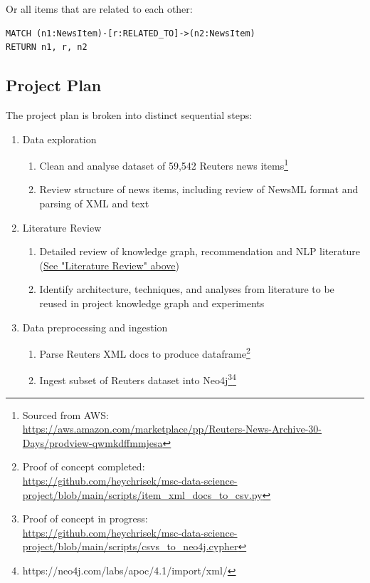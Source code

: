 \documentclass[11pt]{article}
\begin{document}
Or all items that are related to each other:

\begin{verbatim}
MATCH (n1:NewsItem)-[r:RELATED_TO]->(n2:NewsItem)
RETURN n1, r, n2
\end{verbatim}




\subsection{Project Plan}
The project plan is broken into distinct sequential steps:
\begin{enumerate}
\item{Data exploration} \label{sec:PropDataExploration}
  \begin{enumerate}
  \item Clean and analyse dataset of 59,542 Reuters news items\footnote{Sourced from AWS:\\ \url{https://aws.amazon.com/marketplace/pp/Reuters-News-Archive-30-Days/prodview-qwmkdffmmjesa}}
  \item Review structure of news items, including review of NewsML format and parsing of XML and text
  \end{enumerate}
\item{Literature Review} \label{sec:PropLiteratureReview}
  \begin{enumerate}
  \item Detailed review of knowledge graph, recommendation and NLP literature (\hyperref[sec:LiteratureReview]{See "Literature Review" above})
  \item Identify architecture, techniques, and analyses from literature to be reused in project knowledge graph and experiments
  \end{enumerate}
\item{Data preprocessing and ingestion} \label{sec:PropDataProcessing}
  \begin{enumerate}
  \item Parse Reuters XML docs to produce dataframe\footnote{Proof of concept completed:\\ \url{https://github.com/heychrisek/msc-data-science-project/blob/main/scripts/item_xml_docs_to_csv.py}}
  \item Ingest subset of Reuters dataset into Neo4j\footnote{Proof of concept in progress:\\ \url{https://github.com/heychrisek/msc-data-science-project/blob/main/scripts/csvs_to_neo4j.cypher}}\footnote{https://neo4j.com/labs/apoc/4.1/import/xml/}

\end{enumerate}
\end{enumerate}
\end{document}
